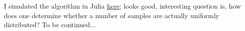 I simulated the algorithm in Julia \href{https://github.com/ClemensFMN/JuliaStuff/blob/master/stochastic/reservoir_sampling.jl}{here}; looks good, interesting question is, how does one determine whether a number of samples are actually uniformly distributed? To be continued...


